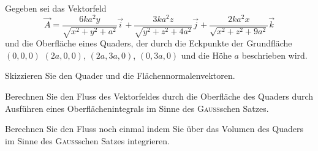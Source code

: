 \begin{atiTask}[
  title = Verifikation des GAUSSschen Satzes,
]

Gegeben sei das Vektorfeld
\[
\vec{A}=\frac{6ka^2y}{\sqrt{x^2+y^2+a^2}}\vec{i} +\frac{3ka^2z}{\sqrt{y^2+z^2+4a^2}}\vec{j}+\frac{2ka^2x}{\sqrt{x^2+z^2+9a^2}}\vec{k}
\]
und die Oberfläche eines Quaders, der durch die Eckpunkte der Grundfläche $(0,0,0)$ $(2a,0,0)$, $(2a,3a,0)$, $(0,3a,0)$ und die Höhe $a$ beschrieben wird.
\begin{atiSubtasks}
\item Skizzieren Sie den Quader und die Flächennormalenvektoren.
\item Berechnen Sie den Fluss des Vektorfeldes durch die Oberfläche des Quaders durch Ausführen eines Oberflächenintegrals im Sinne des \textsc{Gauss}schen Satzes.
\item Berechnen Sie den Fluss noch einmal indem Sie über das Volumen des Quaders im Sinne des \textsc{Gauss}schen Satzes integrieren.
\end{atiSubtasks}

\end{atiTask}

\begin{atiSolution}

\end{atiSolution}

